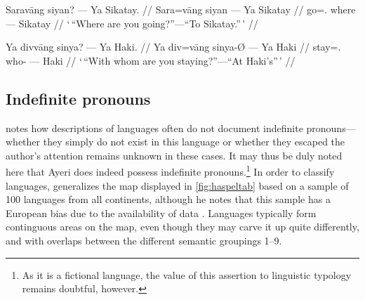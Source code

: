 \pex
\a\begingl
	\gla Saravāng siyan? --- Ya Sikatay. //
	\glb Sara=vāng siyan --- Ya Sikatay //
	\glc go=\Ssg{}.\Aarg{} where --- \Loc{} Sikatay //
	\glft `\,\enquote{Where are you going?}---\enquote{To Sikatay.}\,' //
\endgl

\a\begingl
	\gla Ya divvāng sinya? --- Ya Haki. //
	\glb Ya div=vāng sinya-Ø --- Ya Haki //
	\glc \LocT{} stay=\Ssg{}.\Aarg{} who-\Top{} --- \Loc{} Haki //
	\glft `\,\enquote{With whom are you staying?}---\enquote{At Haki's}\,' //
\endgl

\xe


\subsection{Indefinite pronouns}
\label{subsec:indefpro}

\citet[56]{haspelmath1997} notes how descriptions of languages often do not 
document indefinite pronouns---whether they simply do not exist in this 
language or whether they escaped the author's attention remains unknown in 
these cases. It may thus be duly noted here that Ayeri does indeed possess 
indefinite pronouns.\footnote{As it is a fictional language, the value of this 
assertion to linguistic typology remains doubtful, however.} In order to 
classify languages, \citet{haspelmath1997} generalizes the map displayed 
in \autoref{fig:haspeltab} based on a sample of 100 languages from all 
continents, although he notes that this sample has a European bias due to the 
availability of data \citep[2]{haspelmath1997}. Languages typically form 
continguous areas on the map, even though they may carve it up quite 
differently, and with overlaps between the different semantic groupings 1--9.

